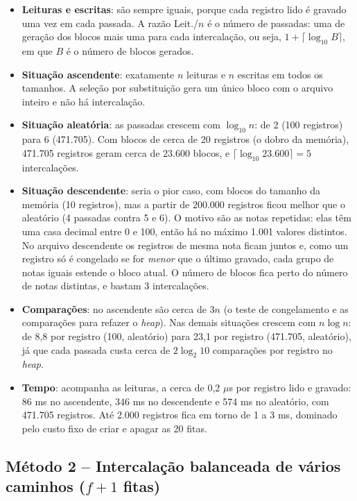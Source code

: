 \documentclass{article}
\begin{document}
\begin{itemize}
    \item \textbf{Leituras e escritas}: são sempre iguais, porque cada registro lido é gravado uma vez em cada passada. A razão Leit./$n$ é o número de passadas: uma de geração dos blocos mais uma para cada intercalação, ou seja, $1 + \lceil \log_{10} B \rceil$, em que $B$ é o número de blocos gerados.
    \item \textbf{Situação ascendente}: exatamente $n$ leituras e $n$ escritas em todos os tamanhos. A seleção por substituição gera um único bloco com o arquivo inteiro e não há intercalação.
    \item \textbf{Situação aleatória}: as passadas crescem com $\log_{10} n$: de 2 (100 registros) para 6 (471.705). Com blocos de cerca de 20 registros (o dobro da memória), 471.705 registros geram cerca de 23.600 blocos, e $\lceil \log_{10} 23.600 \rceil = 5$ intercalações.
    \item \textbf{Situação descendente}: seria o pior caso, com blocos do tamanho da memória (10 registros), mas a partir de 200.000 registros ficou melhor que o aleatório (4 passadas contra 5 e 6). O motivo são as notas repetidas: elas têm uma casa decimal entre 0 e 100, então há no máximo 1.001 valores distintos. No arquivo descendente os registros de mesma nota ficam juntos e, como um registro só é congelado se for \emph{menor} que o último gravado, cada grupo de notas iguais estende o bloco atual. O número de blocos fica perto do número de notas distintas, e bastam 3 intercalações.
    \item \textbf{Comparações}: no ascendente são cerca de $3n$ (o teste de congelamento e as comparações para refazer o \emph{heap}). Nas demais situações crescem com $n \log n$: de 8,8 por registro (100, aleatório) para 23,1 por registro (471.705, aleatório), já que cada passada custa cerca de $2\log_2 10$ comparações por registro no \emph{heap}.
    \item \textbf{Tempo}: acompanha as leituras, a cerca de 0,2 $\mu$s por registro lido e gravado: 86 ms no ascendente, 346 ms no descendente e 574 ms no aleatório, com 471.705 registros. Até 2.000 registros fica em torno de 1 a 3 ms, dominado pelo custo fixo de criar e apagar as 20 fitas.
\end{itemize}

\subsection{Método 2 -- Intercalação balanceada de vários caminhos ($f+1$ fitas)}
\end{document}
